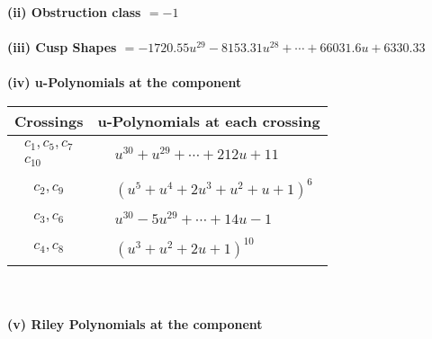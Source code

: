 \documentclass[1p]{elsarticle_modified}
\theoremstyle{definition}
\begin{document}
\flushleft \textbf{(ii) Obstruction class $= -1$}\\~\\
\flushleft \textbf{(iii) Cusp Shapes $= -1720.55 u^{29}-8153.31 u^{28}+\cdots+66031.6 u+6330.33$}\\~\\
\newpage\renewcommand{\arraystretch}{1}
\flushleft \textbf{(iv) u-Polynomials at the component}\newline \\
\begin{tabular}{m{50pt}|m{274pt}}
Crossings & \hspace{64pt}u-Polynomials at each crossing \\
\hline $$\begin{aligned}c_{1},c_{5},c_{7}\\c_{10}\end{aligned}$$&$\begin{aligned}
&u^{30}+u^{29}+\cdots+212 u+11
\end{aligned}$\\
\hline $$\begin{aligned}c_{2},c_{9}\end{aligned}$$&$\begin{aligned}
&(u^5+u^4+2 u^3+u^2+u+1)^6
\end{aligned}$\\
\hline $$\begin{aligned}c_{3},c_{6}\end{aligned}$$&$\begin{aligned}
&u^{30}-5 u^{29}+\cdots+14 u-1
\end{aligned}$\\
\hline $$\begin{aligned}c_{4},c_{8}\end{aligned}$$&$\begin{aligned}
&(u^3+u^2+2 u+1)^{10}
\end{aligned}$\\
\hline
\end{tabular}\\~\\
\newpage\renewcommand{\arraystretch}{1}
\flushleft \textbf{(v) Riley Polynomials at the component}\newline \\
\end{document}
